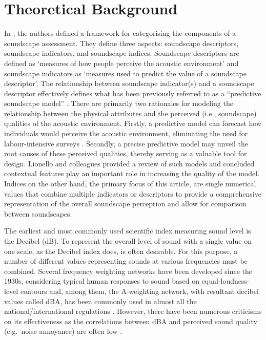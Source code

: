 \documentclass[
  authoryear,
  preprint,
  3p]{elsarticle}
\begin{document}
\section{Theoretical Background}\label{theoretical-background}

In \citet{Aletta2016Soundscape}, the authors defined a framework for
categorising the components of a soundscape assessment. They define
three aspects: soundscape descriptors, soundscape indicators, and
soundscape indices. Soundscape descriptors are defined as `measures of
how people perceive the acoustic environment' and soundscape indicators
as `measures used to predict the value of a soundscape descriptor'. The
relationship between soundscape indicator(s) and a soundscape descriptor
effectively defines what has been previously referred to as a
``predictive soundscape model''
\citep{Aletta2016Soundscape, Mitchell2022Predictive}. There are
primarily two rationales for modeling the relationship between the
physical attributes and the perceived (i.e., soundscape) qualities of
the acoustic environment. Firstly, a predictive model can forecast how
individuals would perceive the acoustic environment, eliminating the
need for labour-intensive surveys \citep{Mitchell2023conceptual}.
Secondly, a precise predictive model may unveil the root causes of these
perceived qualities, thereby serving as a valuable tool for design.
Lionello and colleagues \citep{Lionello2020systematic} provided a review
of such models and concluded contextual features play an important role
in increasing the quality of the model. Indices on the other hand, the
primary focus of this article, are single numerical values that combine
multiple indicators or descriptors to provide a comprehensive
representation of the overall soundscape perception and allow for
comparison between soundscapes.

The earliest and most commonly used scientific index measuring sound
level is the Decibel (dB). To represent the overall level of sound with
a single value on one scale, as the Decibel index does, is often
desirable. For this purpose, a number of different values representing
sounds at various frequencies must be combined. Several frequency
weighting networks have been developed since the 1930s, considering
typical human responses to sound based on equal-loudness-level contours
\citep{Fletcher1933Loudness} and, among them, the A-weighting network,
with resultant decibel values called dBA, has been commonly used in
almost all the national/international regulations
\citep{Kryter1970Effects}. However, there have been numerous criticisms
on its effectiveness \citep{Parmanen2007weighted} as the correlations
between dBA and perceived sound quality (e.g.~noise annoyance) are often
low \citep{Hellman1987Why}.
\end{document}
